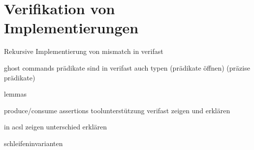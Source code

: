 ﻿\section{Verifikation von Implementierungen}

Rekursive Implementierung von mismatch
in verifast

ghost commands
prädikate sind in verifast auch typen
(prädikate öffnen)
(präzise prädikate)


lemmas

produce/consume assertions
toolunterstützung verifast zeigen und erklären


in acsl zeigen
unterschied erklären


schleifeninvarianten


